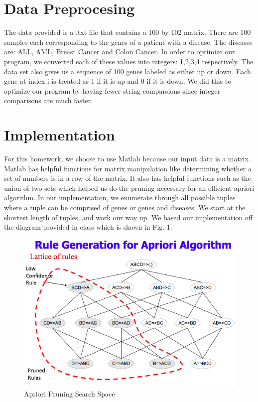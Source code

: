 \documentclass[12pt]{article}
\begin{document}
\section*{Data Preprocesing}
\noindent The data provided is a .txt file that contains a 100 by 102 matrix. There are 100 samples each corresponding to the genes of a patient with a disease. The diseases are: ALL, AML, Breast Cancer and Colon Cancer. In order to optimize our program, we converted each of these values into integers: 1,2,3,4 respectively. The data set also gives us a sequence of 100 genes labeled as either up or down. Each gene at index i is treated as 1 if it is up and 0 if it is down. We did this to optimize our program by having fewer string comparsions since integer comparisons are much faster. 

\section*{Implementation}
\noindent For this homework, we choose to use Matlab because our input data is a matrix. Matlab has helpful functions for matrix manipulation like determining whether a set of numbers is in a row of the matrix. It also has helpful functions such as the union of two sets which helped us do the pruning necessary for an efficient apriori algorithm. In our implementation, we enumerate through all possible tuples where a tuple can be comprised of genes or genes and diseases. We start at the shortest length of tuples, and work our way up. We based our implementation off the diagram provided in class which is shown in Fig. 1. 

\begin{figure}[h]
	\centering
	\includegraphics[width=\textwidth]{apriori}
	\caption{Apriori Pruning Search Space}
\end{figure}
\end{document}
